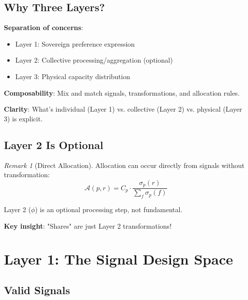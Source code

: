 \documentclass[11pt,a4paper]{article}
\theoremstyle{definition}
\theoremstyle{remark}
\newtheorem{remark}[theorem]{Remark}
\newcommand{\A}{\mathcal{A}}
\begin{document}
\subsection{Why Three Layers?}

\textbf{Separation of concerns}:
\begin{itemize}
\item Layer 1: Sovereign preference expression
\item Layer 2: Collective processing/aggregation (optional)
\item Layer 3: Physical capacity distribution
\end{itemize}

\textbf{Composability}: Mix and match signals, transformations, and allocation rules.

\textbf{Clarity}: What's individual (Layer 1) vs. collective (Layer 2) vs. physical (Layer 3) is explicit.

\subsection{Layer 2 Is Optional}

\begin{remark}[Direct Allocation]
Allocation can occur directly from signals without transformation:
\[ \A(p,r) = C_p \cdot \frac{\sigma_p(r)}{\sum_f \sigma_p(f)} \]

Layer 2 ($\phi$) is an optional processing step, not fundamental.

\textbf{Key insight}: "Shares" are just Layer 2 transformations!
\end{remark}

\section{Layer 1: The Signal Design Space}

\subsection{Valid Signals}
\end{document}
